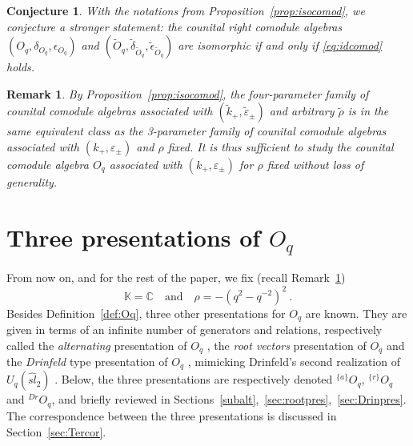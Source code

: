 \documentclass[11pt]{amsart}
\numberwithin{equation}{section}
\newtheorem{conj}[thm]{Conjecture}
\newtheorem{rem}[thm]{Remark}
\numberwithin{equation}{section}
\begin{document}
\begin{conj}\label{conj:IsoCom}
With the notations from Proposition~\ref{prop:isocomod},
we conjecture a stronger statement: the counital right comodule algebras $(O_q,\delta_{O_q},\epsilon_{O_q})$ and  $(\tilde{O}_q,\tilde{\delta}_{\tilde{O}_q},\tilde{\epsilon}_{\tilde{O}_q})$ are isomorphic  if and only if \eqref{eq:idcomod} holds.
\end{conj}

\begin{rem}\label{rem:equiv-classes}
By Proposition~\ref{prop:isocomod}, the four-parameter family of counital comodule algebras associated with  $(\tilde{k}_+,\tilde{\varepsilon}_\pm)$ and arbitrary $\tilde{\rho}$ is in the same equivalent class as the  3-parameter family of counital comodule algebras associated with  $(k_+,\varepsilon_\pm)$ and $\rho$ fixed. It is thus sufficient to study the counital comodule algebra $O_q$ associated with $(k_+,\varepsilon_\pm)$ for $\rho$ fixed without loss of generality. 
\end{rem}

\section{Three presentations of $O_q$}\label{sec:Oqcomod}
From now on, and for the rest of the paper, we fix (recall Remark~\ref{rem:equiv-classes})
\begin{equation}
	{\mathbb K}={\mathbb C} \quad \mbox{and}\quad  \rho= - (q^2-q^{-2})^2 \ . 
	\label{rhofix}
\end{equation}
Besides Definition~\ref{def:Oq}, three other presentations for $O_q$ are known. They are given in terms of an infinite number of generators and relations, respectively called the {\it alternating} presentation of $O_q$ \cite{BasBel,Ter21b,LBG}, the {\it root vectors} presentation of $O_q$ \cite{BK17} and the {\it Drinfeld} type presentation of $O_q$ \cite{LW20}, mimicking Drinfeld's second realization of $U_q(\widehat{sl}_2)$ \cite{Dr0,Dr88}. Below, the three presentations are
respectively denoted $^{\{a\}}O_q$, $^{\{r\}}O_q$ and $^{Dr}O_q$, and briefly reviewed in Sections~\ref{subalt},~\ref{sec:rootpres},~\ref{sec:Drinpres}. The correspondence between the three presentations is discussed in Section~\ref{sec:Tercor}.
\end{document}
